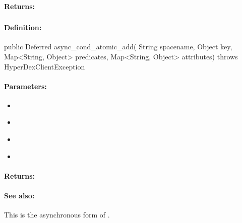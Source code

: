 \paragraph{Returns:}


\pagebreak
\subsubsection{}
\label{api:java:async_cond_atomic_add}


\paragraph{Definition:}
\begin{javacode}
public Deferred async_cond_atomic_add(
        String spacename,
        Object key,
        Map<String, Object> predicates,
        Map<String, Object> attributes) throws HyperDexClientException
\end{javacode}

\paragraph{Parameters:}
\begin{itemize}[noitemsep]
\item {}\\

\item {}\\

\item {}\\

\item {}\\

\end{itemize}

\paragraph{Returns:}


\paragraph{See also:}  This is the asynchronous form of .

